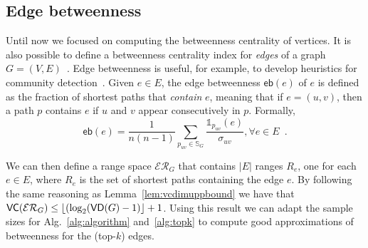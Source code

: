
\subsection{Edge betweenness}
Until now we focused on computing the betweenness centrality of vertices. It is
also possible to define a betweenness centrality index for \emph{edges} of a
graph $G=(V,E)$~\citep{Anthonisse71,Brandes08}. Edge betweenness is useful, for
example, to develop heuristics for community detection~\citep{NewmanG04}. Given
$e\in E$, the edge betweenness $\mathsf{eb}(e)$ of $e$ is defined as the
fraction of shortest paths that \emph{contain} $e$, meaning that if $e=(u,v)$,
then a path $p$ contains $e$ if $u$ and $v$ appear consecutively in $p$.
Formally,
\[
\mathsf{eb}(e)=\frac{1}{n(n-1)}\sum_{p_{uv}\in\mathbb{S}_G}\frac{\mathds{1}_{p_{uv}}(e)}{\sigma_{uv}}, \forall e\in E\enspace.
\]

We can then define a range space $\mathcal{ER}_G$ that contains $|E|$ ranges $R_e$, one
for each $e\in E$, where $R_e$ is the set of shortest paths containing the edge
$e$. By following the same reasoning as Lemma~\ref{lem:vcdimuppbound} we have that
$\mathsf{VC}(\mathcal{ER}_G)\le\lfloor(\log_2(\mathsf{VD}(G) - 1)\rfloor + 1$. Using this result we can
adapt the sample sizes for Alg.~\ref{alg:algorithm} and~\ref{alg:topk} to
compute good approximations of betweenness for the (top-$k$) edges.

\fi

